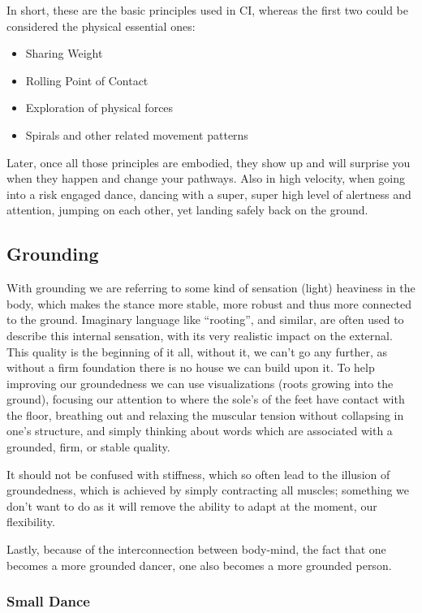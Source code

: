 In short, these are the basic principles used in CI, whereas the first two could be considered the physical essential ones:

\begin{itemize}
    \item Sharing Weight
    \item Rolling Point of Contact
    \item Exploration of physical forces
    \item Spirals and other related movement patterns
\end{itemize}

Later, once all those principles are embodied, they show up and will surprise you when they happen and change your pathways.
Also in high velocity, when going into a risk engaged dance, dancing with a super, super high level of alertness and attention, jumping on each other, yet landing safely back on the ground.

\subsection{Grounding}\label{subsec:grounding}

With grounding we are referring to some kind of sensation (light) heaviness in the body, which makes the stance more stable, more robust and thus more connected to the ground.
Imaginary language like ``rooting'', and similar, are often used to describe this internal sensation, with its very realistic impact on the external.
This quality is the beginning of it all, without it, we can't go any further, as without a firm foundation there is no house we can build upon it.
To help improving our groundedness we can use visualizations (roots growing into the ground), focusing our attention to where the sole's of the feet have contact with the floor, breathing out and relaxing the muscular tension without collapsing in one's structure, and simply thinking about words which are associated with a grounded, firm, or stable quality.

It should not be confused with stiffness, which so often lead to the illusion of groundedness, which is achieved by simply contracting all muscles; something we don't want to do as it will remove the ability to adapt at the moment, our flexibility.

Lastly, because of the interconnection between body-mind, the fact that one becomes a more grounded dancer, one also becomes a more grounded person.

\subsubsection{Small Dance}


